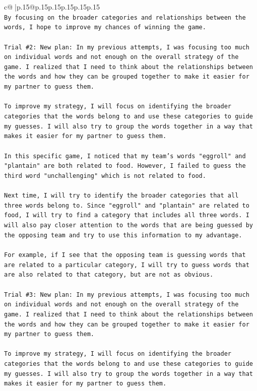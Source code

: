 \documentclass{article}
\begin{document}
{\begin{supertabular}{c@{$\;$}|p{.15\linewidth}@{}p{.15\linewidth}p{.15\linewidth}p{.15\linewidth}p{.15\linewidth}p{.15\linewidth}}
{{{\\ 
\texttt{By focusing on the broader categories and relationships between the words, I hope to improve my chances of winning the game.} \\
\\ 
\texttt{Trial \#2: New plan: In my previous attempts, I was focusing too much on individual words and not enough on the overall strategy of the game. I realized that I need to think about the relationships between the words and how they can be grouped together to make it easier for my partner to guess them. } \\
\\ 
\texttt{To improve my strategy, I will focus on identifying the broader categories that the words belong to and use these categories to guide my guesses. I will also try to group the words together in a way that makes it easier for my partner to guess them. } \\
\\ 
\texttt{In this specific game, I noticed that my team's words "eggroll" and "plantain" are both related to food. However, I failed to guess the third word "unchallenging" which is not related to food. } \\
\\ 
\texttt{Next time, I will try to identify the broader categories that all three words belong to. Since "eggroll" and "plantain" are related to food, I will try to find a category that includes all three words. I will also pay closer attention to the words that are being guessed by the opposing team and try to use this information to my advantage. } \\
\\ 
\texttt{For example, if I see that the opposing team is guessing words that are related to a particular category, I will try to guess words that are also related to that category, but are not as obvious.} \\
\\ 
\texttt{Trial \#3: New plan: In my previous attempts, I was focusing too much on individual words and not enough on the overall strategy of the game. I realized that I need to think about the relationships between the words and how they can be grouped together to make it easier for my partner to guess them. } \\
\\ 
\texttt{To improve my strategy, I will focus on identifying the broader categories that the words belong to and use these categories to guide my guesses. I will also try to group the words together in a way that makes it easier for my partner to guess them. } \\
}}}
\end{supertabular}}
\end{document}
